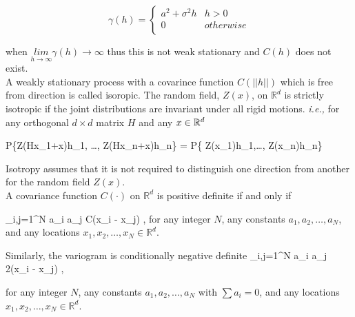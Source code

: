 \[
	\gamma(h) = \left \{ \begin{array}{cc}
	a^2+\sigma^2h & h>0 \\
	0 & otherwise \\
	\end{array}
	\right.
\]

when $\underset{h \to \infty} {lim} \gamma(h) \to \infty$ thus this is not weak stationary and $C(h)$ does not exist. \\


A weakly stationary process with a covarince function $C(||h||)$ which is free from direction is called isoropic. The random field, $Z(x)$, on $\mathbb{R}^d$ is strictly isotropic if the joint distributions are invariant under all rigid motions. {\em i.e.,} for any orthogonal $d\times d$ matrix $H$ and any $x\in \mathbb{R}^d$

\beq
P\{Z(Hx_1+x)\le h_1, \ldots, Z(Hx_n+x)\le h_n\} = P\{ Z(x_1)\le h_1,\ldots, Z(x_n)\le h_n\}
\eeq

Isotropy assumes that it is not required to distinguish one direction from another for the random field $Z(x)$.\\


A covariance function $C(\cdot)$ on $\mathbb{R}^d$ is positive definite  if and only if 

\beq
\sum_{i,j=1}^{N} a_i a_j C(x_i - x_j) ,
\eeq
for any integer $N$, any constants $a_1, a_2, \ldots, a_N$, and any locations $x_1, x_2, \ldots, x_N \in \mathbb{R}^d$.

Similarly, the variogram is conditionally negative definite
\beq
\sum_{i,j=1}^{N} a_i a_j 2\gamma(x_i - x_j) ,
\eeq

for any integer $N$, any constants $a_1, a_2, \ldots, a_N$ with $\sum a_i = 0$, and any locations $x_1, x_2, \ldots, x_N \in \mathbb{R}^d$.



